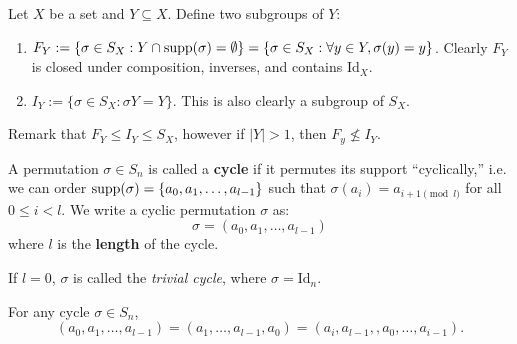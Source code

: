 \begin{example}
    Let $X$ be a set and $Y \subseteq X$. Define two subgroups of $Y$:
    \begin{enumerate}
        \item $F_Y := \{\sigma \in S_X : Y \cap \text{supp}(\sigma) = \emptyset\} = \{\sigma \in S_X : \forall y \in Y, \sigma(y) = y\}$. Clearly $F_Y$ is closed under composition, inverses, and contains $\text{Id}_X$. 
        \item $I_Y := \{\sigma \in S_X : \sigma{Y} = Y\}$. This is also clearly a subgroup of $S_X$.
    \end{enumerate}
    Remark that $F_Y \leq I_Y \leq S_X$, however if $|Y| > 1$, then $F_y \nleq I_Y$. 
\end{example}

\begin{defbox}
    A permutation $\sigma \in S_n$ is called a \textbf{cycle} if it permutes its support ``cyclically,'' i.e. we can order $\text{supp}(\sigma) = \{a_0, a_1, \dots, a_{l-1}\}$ such that $\sigma(a_i) = a_{i+1 \pmod{l}}$ for all $0 \leq i < l$. We write a cyclic permutation $\sigma$ as:
    \[ \sigma = (a_0, a_1, \dots, a_{l-1}) \]
    where $l$ is the \textbf{length} of the cycle. 
\end{defbox}

If $l = 0$, $\sigma$ is called the \textit{trivial cycle}, where $\sigma = \text{Id}_n$. 

\begin{remark}
    For any cycle $\sigma \in S_n$,
    \[ (a_0, a_1, \dots, a_{l-1}) = (a_1, \dots, a_{l-1}, a_0) = (a_i, a_{l-1}, , a_0, \dots, a_{i-1}). \]
\end{remark}


